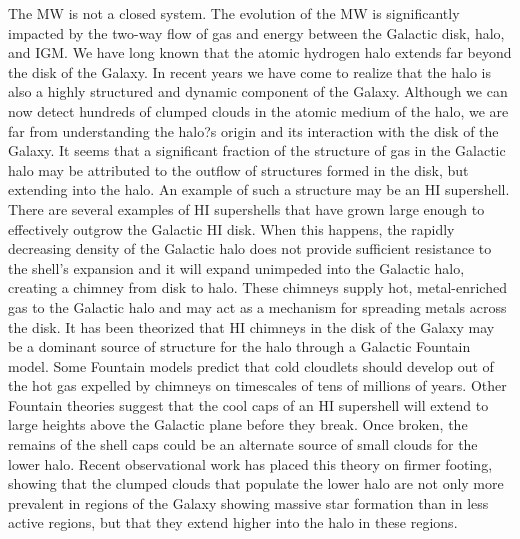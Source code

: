 \documentclass[a4paper,10pt]{article}
\begin{document}
{\noindent}The MW is not a closed system. The evolution of the MW is significantly impacted by the two-way flow of gas and energy between the Galactic disk, halo, and IGM. We have long known that the atomic hydrogen halo extends far beyond the disk of the Galaxy. In recent years we have come to realize that the halo is also a highly structured and dynamic component of the Galaxy. Although we can now detect hundreds of clumped clouds in the atomic medium of the halo, we are far from understanding the halo?s origin and its interaction with the disk of the Galaxy. It seems that a significant fraction of the structure of gas in the Galactic halo may be attributed to the outflow of structures formed in the disk, but extending into the halo. An example of such a structure may be an HI supershell. There are several examples of HI supershells that have grown large enough to effectively outgrow the Galactic HI disk. When this happens, the rapidly decreasing density of the Galactic halo does not provide sufficient resistance to the shell's expansion and it will expand unimpeded into the Galactic halo, creating a chimney from disk to halo. These chimneys supply hot, metal-enriched gas to the Galactic halo and may act as a mechanism for spreading metals across the disk. It has been theorized that HI chimneys in the disk of the Galaxy may be a dominant source of structure for the halo through a Galactic Fountain model. Some Fountain models predict that cold cloudlets should develop out of the hot gas expelled by chimneys on timescales of tens of millions of years. Other Fountain theories suggest that the cool caps of an HI supershell will extend to large heights above the Galactic plane before they break. Once broken, the remains of the shell caps could be an alternate source of small clouds for the lower halo. Recent observational work has placed this theory on firmer footing, showing that the clumped clouds that populate the lower halo are not only more prevalent in regions of the Galaxy showing massive star formation than in less active regions, but that they extend higher into the halo in these regions. 
\end{document}
